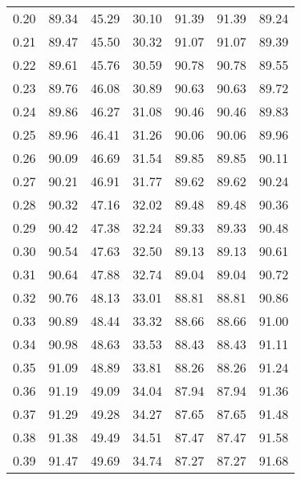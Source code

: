 \begin{tabular}{|c|c|c|c|c|c|c|}
      0.20 &     89.34 &     45.29 &      30.10 &   91.39 &      91.39 &         89.24 \\
      0.21 &     89.47 &     45.50 &      30.32 &   91.07 &      91.07 &         89.39 \\
      0.22 &     89.61 &     45.76 &      30.59 &   90.78 &      90.78 &         89.55 \\
      0.23 &     89.76 &     46.08 &      30.89 &   90.63 &      90.63 &         89.72 \\
      0.24 &     89.86 &     46.27 &      31.08 &   90.46 &      90.46 &         89.83 \\
      0.25 &     89.96 &     46.41 &      31.26 &   90.06 &      90.06 &         89.96 \\
      0.26 &     90.09 &     46.69 &      31.54 &   89.85 &      89.85 &         90.11 \\
      0.27 &     90.21 &     46.91 &      31.77 &   89.62 &      89.62 &         90.24 \\
      0.28 &     90.32 &     47.16 &      32.02 &   89.48 &      89.48 &         90.36 \\
      0.29 &     90.42 &     47.38 &      32.24 &   89.33 &      89.33 &         90.48 \\
      0.30 &     90.54 &     47.63 &      32.50 &   89.13 &      89.13 &         90.61 \\
      0.31 &     90.64 &     47.88 &      32.74 &   89.04 &      89.04 &         90.72 \\
      0.32 &     90.76 &     48.13 &      33.01 &   88.81 &      88.81 &         90.86 \\
      0.33 &     90.89 &     48.44 &      33.32 &   88.66 &      88.66 &         91.00 \\
      0.34 &     90.98 &     48.63 &      33.53 &   88.43 &      88.43 &         91.11 \\
      0.35 &     91.09 &     48.89 &      33.81 &   88.26 &      88.26 &         91.24 \\
      0.36 &     91.19 &     49.09 &      34.04 &   87.94 &      87.94 &         91.36 \\
      0.37 &     91.29 &     49.28 &      34.27 &   87.65 &      87.65 &         91.48 \\
      0.38 &     91.38 &     49.49 &      34.51 &   87.47 &      87.47 &         91.58 \\
      0.39 &     91.47 &     49.69 &      34.74 &   87.27 &      87.27 &         91.68 \\

\end{tabular}
